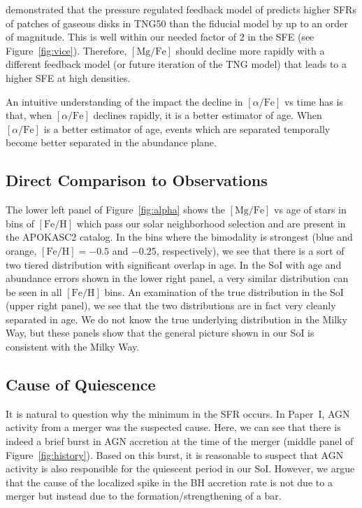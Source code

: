 \documentclass[twocolumn]{aastex631}
\newcommand{\FeH}{\ensuremath{[\textrm{Fe}/\textrm{H}]}}
\newcommand{\MgFe}{\ensuremath{[\textrm{Mg}/\textrm{Fe}]}}
\newcommand{\alphaFe}{\ensuremath{[\alpha/\textrm{Fe}]}}
\begin{document}
\citet{2024arXiv240909121H} demonstrated that the pressure regulated feedback model of \citet{2022ApJ...936..137O} predicts higher SFRs of patches of gaseous disks in TNG50 than the fiducial model by up to an order of magnitude. This is well within our needed factor of $2$ in the SFE (see Figure~\ref{fig:vice}). Therefore, \MgFe{} should decline more rapidly with a different feedback model (or future iteration of the TNG model) that leads to a higher SFE at high densities.

An intuitive understanding of the impact the decline in \alphaFe{} vs time has is that, when \alphaFe{} declines rapidly, it is a better estimator of age. When \alphaFe{} is a better estimator of age, events which are separated temporally become better separated in the abundance plane.

\subsection{Direct Comparison to Observations}\label{ssec:compare_obs}
The lower left panel of Figure~\ref{fig:alpha} shows the \MgFe{} vs age of stars in bins of \FeH{} which pass our solar neighborhood selection and are present in the APOKASC2 catalog. In the bins where the bimodality is strongest (blue and orange, $\FeH=-0.5$ and $-0.25$, respectively), we see that there is a sort of two tiered distribution with significant overlap in age. In the SoI with age and abundance errors shown in the lower right panel, a very similar distribution can be seen in all \FeH{} bins. An examination of the true distribution in the SoI (upper right panel), we see that the two distributions are in fact very cleanly separated in age. We do not know the true underlying distribution in the Milky Way, but these panels show that the general picture shown in our SoI is consistent with the Milky Way.

\subsection{Cause of Quiescence}\label{ssec:cause_qui}
It is natural to question why the minimum in the SFR occurs. In Paper~I, AGN activity from a merger was the suspected cause. Here, we can see that there is indeed a brief burst in AGN accretion at the time of the merger (middle panel of Figure~\ref{fig:history}). Based on this burst, it is reasonable to suspect that AGN activity is also responsible for the quiescent period in our SoI. However, we argue that the cause of the localized spike in the BH accretion rate is not due to a merger but instead due to the formation/strengthening of a bar.
\end{document}
